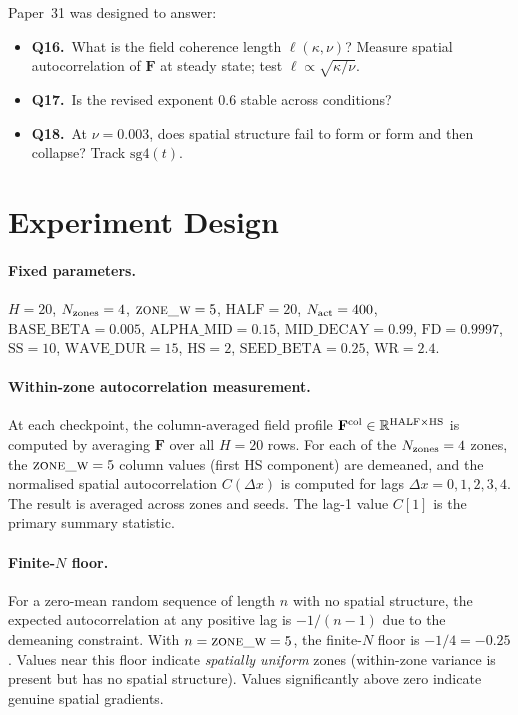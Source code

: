 \documentclass[11pt,a4paper]{article}
\begin{document}
Paper~31 was designed to answer:
\begin{itemize}
  \item \textbf{Q16.}\ What is the field coherence length $\ell(\kappa, \nu)$?  Measure
    spatial autocorrelation of $\mathbf{F}$ at steady state; test $\ell \propto
    \sqrt{\kappa/\nu}$.
  \item \textbf{Q17.}\ Is the revised exponent $0.6$ stable across conditions?
  \item \textbf{Q18.}\ At $\nu=0.003$, does spatial structure fail to form or form and
    then collapse?  Track $\mathrm{sg4}(t)$.
\end{itemize}

\section{Experiment Design}
\label{sec:design}

\paragraph{Fixed parameters.}
$H=20$, $N_{\rm zones}=4$, $\textsc{zone\_w}=5$, $\mathrm{HALF}=20$, $N_{\rm act}=400$,
$\mathrm{BASE\_BETA}=0.005$, $\mathrm{ALPHA\_MID}=0.15$, $\mathrm{MID\_DECAY}=0.99$,
$\mathrm{FD}=0.9997$, $\mathrm{SS}=10$, $\mathrm{WAVE\_DUR}=15$, $\mathrm{HS}=2$,
$\mathrm{SEED\_BETA}=0.25$, $\mathrm{WR}=2.4$.

\paragraph{Within-zone autocorrelation measurement.}
At each checkpoint, the column-averaged field profile $\mathbf{F}^{\rm col} \in
\mathbb{R}^{\mathrm{HALF}\times\mathrm{HS}}$ is computed by averaging $\mathbf{F}$
over all $H=20$ rows.  For each of the $N_{\rm zones}=4$ zones, the $\textsc{zone\_w}=5$
column values (first HS component) are demeaned, and the normalised spatial autocorrelation
$C(\Delta x)$ is computed for lags $\Delta x = 0, 1, 2, 3, 4$.  The result is averaged
across zones and seeds.  The lag-1 value $C[1]$ is the primary summary statistic.

\paragraph{Finite-$N$ floor.}
For a zero-mean random sequence of length $n$ with no spatial structure, the expected
autocorrelation at any positive lag is $-1/(n-1)$ due to the demeaning constraint.
With $n = \textsc{zone\_w} = 5$, the finite-$N$ floor is $-1/4 = -0.25$.  Values near
this floor indicate \emph{spatially uniform} zones (within-zone variance is present but
has no spatial structure).  Values significantly above zero indicate genuine spatial
gradients.
\end{document}
